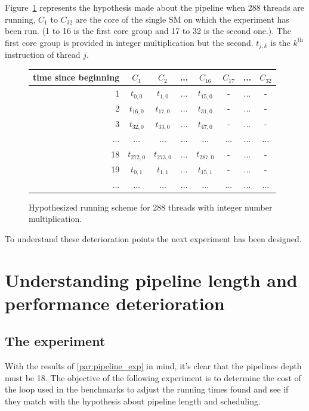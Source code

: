 \documentclass{report}
\begin{document}
    Figure~\ref{fig:int_prediction_256} represents the hypothesis made about the pipeline when 288
    threads are running, $C_1$ to $C_{32}$ are the core of the single SM on which the experiment
    has been run. (1 to 16 is the first core group and 17 to 32 is the second one.). The first
    core group is provided in integer multiplication but the second. $t_{j,k}$ is the $k^{\text{th}}$ instruction of thread $j$.
   \begin{figure}[H]
      \centering
       \begin{tabular}{ | r || c | c | c | c || c | c | c | }
    	    \hline
    	    time since beginning & $C_1$ & $C_2$ & ... & $C_{16}$ & $C_{17}$ & ... & $C_{32}$ \\ \hline  \hline
    	   1 & $t_{0,0}$ & $t_{1,0}$ & ... & $t_{15,0}$ & - & ... & - \\ \hline 
    	   2 & $t_{16,0}$ & $t_{17,0}$ & ... & $t_{31,0}$ & - & ... & - \\ \hline
    	   3 & $t_{32,0}$ & $t_{33,0}$ & ... & $t_{47,0}$ & - & ... & - \\ \hline
    	   ... & ... & ... & ... & ... & ... & ... & ... \\ \hline
    	   18 & $t_{272,0}$ & $t_{273,0}$ & ... & $t_{287,0}$ & - & ... & - \\ \hline
    	   19 & $t_{0,1}$ & $t_{1,1}$ & ... & $t_{15,1}$ & - & ... & - \\ \hline
    	   ... & ... & ... & ... & ... & ... & ... & ... \\ \hline
  	\end{tabular}
  	\captionsetup{justification=centering}
  	\caption{Hypothesized running scheme for 288 threads with integer number multiplication.}
  	\label{fig:int_prediction_256}
   \end{figure}

    To understand these deterioration points the next experiment has been designed.

\section{Understanding pipeline length and performance deterioration}
    \subsection{The experiment}
    With the results of \ref{par:pipeline_exp} in mind, it's clear that the pipelines depth 
    must be 18. The objective of the following experiment is to determine the cost of
    the loop used in the benchmarks to adjust the running times found and see if they match with
    the hypothesis about pipeline length and scheduling. 
\end{document}
